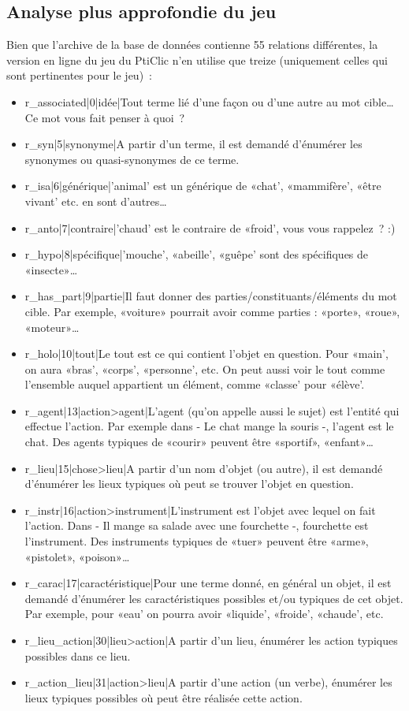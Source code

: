 \documentclass[a4paper,11pt,french]{article}
\begin{document}
\subsection{Analyse plus approfondie du jeu}
Bien que l'archive de la base de données contienne 55 relations différentes, la version en ligne du jeu du PtiClic n'en utilise que treize (uniquement celles qui sont pertinentes pour le jeu)~:

\begin{itemize}
\item r\_associated|0|idée|Tout terme lié d'une façon ou d'une autre au mot cible\dots{} Ce mot vous fait penser à quoi~? 
\item r\_syn|5|synonyme|A partir d'un terme, il est demandé d'énumérer les synonymes ou quasi-synonymes de ce terme. \item r\_isa|6|générique|'animal' est un générique de «chat', «mammifère', «être vivant' etc. en sont d'autres\dots{}
\item r\_anto|7|contraire|'chaud' est le contraire de «froid', vous vous rappelez~? :)
\item r\_hypo|8|spécifique|'mouche', «abeille', «guêpe' sont des spécifiques de «insecte»\dots{}
\item r\_has\_part|9|partie|Il faut donner des parties/constituants/éléments du mot cible. Par exemple, «voiture» pourrait avoir comme parties : «porte», «roue», «moteur»\dots{}
\item r\_holo|10|tout|Le tout est ce qui contient l'objet en question. Pour «main', on aura «bras', «corps', «personne', etc. On peut aussi voir le tout comme l'ensemble auquel appartient un élément, comme «classe' pour «élève'.
\item r\_agent|13|action>agent|L'agent (qu'on appelle aussi le sujet) est l'entité qui effectue l'action. Par exemple dans - Le chat mange la souris -, l'agent est le chat. Des agents typiques de «courir» peuvent être «sportif», «enfant»\dots{} 
\item r\_lieu|15|chose>lieu|A partir d'un nom d'objet (ou autre), il est demandé d'énumérer les lieux typiques où peut se trouver l'objet en question.
\item r\_instr|16|action>instrument|L'instrument est l'objet avec lequel on fait l'action. Dans - Il mange sa salade avec une fourchette -, fourchette est l'instrument. Des instruments typiques de «tuer» peuvent être «arme», «pistolet», «poison»\dots{}
\item r\_carac|17|caractéristique|Pour une terme donné, en général un objet, il est demandé d'énumérer les caractéristiques possibles et/ou typiques de cet objet. Par exemple, pour «eau' on pourra avoir «liquide', «froide', «chaude', etc.
\item r\_lieu\_action|30|lieu>action|A partir d'un lieu, énumérer les action typiques possibles dans ce lieu.
\item r\_action\_lieu|31|action>lieu|A partir d'une action (un verbe), énumérer les lieux typiques possibles où peut être réalisée cette action.
\end{itemize}
\end{document}
